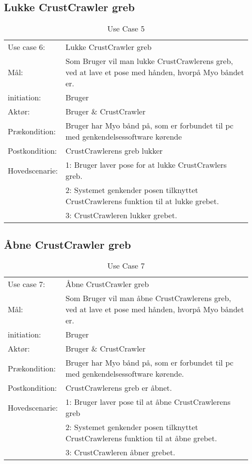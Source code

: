 \subsection{Lukke CrustCrawler greb}
\begin{center}
	\begin{table}[htbp]
		\begin{tabular}{lp{274pt}}
			\rowcolor{grey} Use case 6:		& Lukke CrustCrawler greb \\
			Mål: & Som Bruger vil man lukke CrustCrawlerens greb, ved at lave et pose med hånden, hvorpå Myo båndet er. \\
			initiation:	& Bruger\\
			Aktør: & Bruger \& CrustCrawler\\
			Prækondition: & Bruger har Myo bånd på, som er forbundet til pc med genkendelsessoftware kørende \\
			Postkondition: & CrustCrawlerens greb lukker \\
			Hovedscenarie: & 1: Bruger laver pose for at lukke CrustCrawlers greb. \\
			& 2: Systemet genkender posen tilknyttet CrustCrawlerens funktion til at lukke grebet.\\
			& 3: CrustCrawleren lukker grebet.\\

		\end{tabular}
		\caption{Use Case 5}
	\end{table}
\end{center}

\subsection{Åbne CrustCrawler greb}
\begin{center}
	\begin{table}[htbp]
		\begin{tabular}{lp{274pt}}
			\rowcolor{grey} Use case 7:		& Åbne CrustCrawler greb\\
			Mål: & Som Bruger vil man åbne CrustCrawlerens greb, ved at lave et pose  med hånden, hvorpå Myo båndet er.\\
			initiation:	& Bruger \\
			Aktør: & Bruger \& CrustCrawler\\
			Prækondition: & Bruger har Myo bånd på, som er forbundet til pc med genkendelsessoftware kørende. \\
			Postkondition: & CrustCrawlerens greb er åbnet. \\
			Hovedscenarie: & 1: Bruger laver pose til at åbne CrustCrawlerens greb\\
			& 2: Systemet genkender posen tilknyttet CrustCrawlerens funktion til at åbne grebet.\\
			& 3: CrustCrawleren åbner grebet.\\
		\end{tabular}
		\caption{Use Case 7}
	\end{table}
\end{center}

\egroup